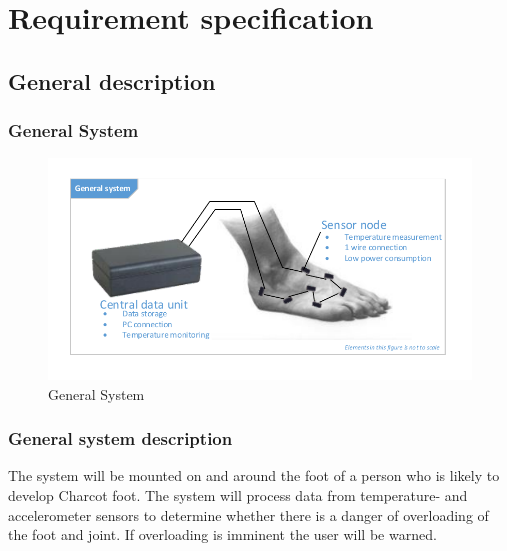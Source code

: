 



\chapter{Requirement specification}
\section{General description}

\subsection{General System}
\begin{figure}[H]
	\centering
	\includegraphics[width=1\textwidth]{billeder/GeneralSystem}
	\caption{General System}
\end{figure}

\subsection{General system description}
The system will be mounted on and around the foot of a person who is likely to develop Charcot foot. The system will process data from temperature- and accelerometer sensors to determine whether there is a danger of overloading of the foot and joint. If overloading is imminent the user will be warned.


